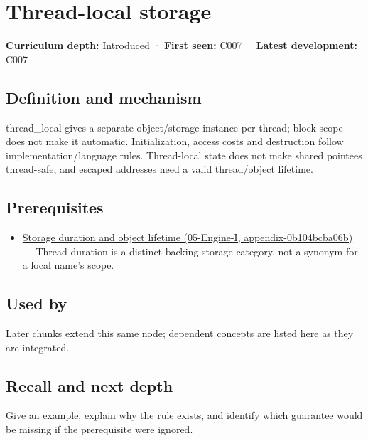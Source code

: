 \hypertarget{appendix-3b88c6cd7195}{}
\section{Thread-local storage}\label{appendix-3b88c6cd7195-thread-local-storage}

\textbf{Curriculum depth:} Introduced · \textbf{First seen:} C007 · \textbf{Latest development:} C007

\subsection{Definition and mechanism}\label{appendix-3b88c6cd7195-definition-and-mechanism}

thread\_local gives a separate object/storage instance per thread; block scope does not make it automatic. Initialization, access costs and destruction follow implementation/language rules. Thread-local state does not make shared pointees thread-safe, and escaped addresses need a valid thread/object lifetime.

\subsection{Prerequisites}\label{appendix-3b88c6cd7195-prerequisites}

\begin{itemize}
\tightlist
\item
  \href{../05-Engine-I/main.pdf\#nameddest=appendix-0b104bcba06b}{Storage duration and object lifetime (05-Engine-I, appendix-0b104bcba06b)} --- Thread duration is a distinct backing-storage category, not a synonym for a local name's scope.
\end{itemize}

\subsection{Used by}\label{appendix-3b88c6cd7195-used-by}

Later chunks extend this same node; dependent concepts are listed here as they are integrated.

\subsection{Recall and next depth}\label{appendix-3b88c6cd7195-recall-and-next-depth}

Give an example, explain why the rule exists, and identify which guarantee would be missing if the prerequisite were ignored.


